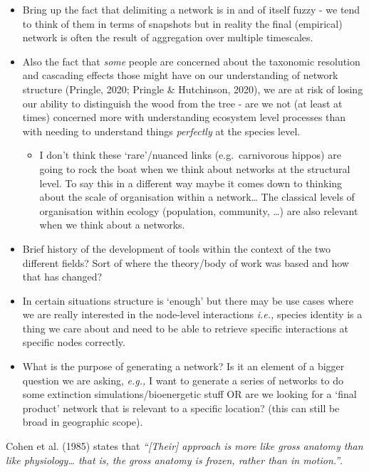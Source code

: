 \documentclass[
]{article}
\providecommand{\tightlist}{%
  \setlength{\itemsep}{0pt}\setlength{\parskip}{0pt}}\usepackage{longtable,booktabs,array}
\begin{document}
\begin{itemize}
\item
  Bring up the fact that delimiting a network is in and of itself fuzzy
  - we tend to think of them in terms of snapshots but in reality the
  final (empirical) network is often the result of aggregation over
  multiple timescales.
\item
  Also the fact that \emph{some} people are concerned about the
  taxonomic resolution and cascading effects those might have on our
  understanding of network structure (Pringle, 2020; Pringle \&
  Hutchinson, 2020), we are at risk of losing our ability to distinguish
  the wood from the tree - are we not (at least at times) concerned more
  with understanding ecosystem level processes than with needing to
  understand things \emph{perfectly} at the species level.

  \begin{itemize}
  \tightlist
  \item
    I don't think these `rare'/nuanced links (e.g.~carnivorous hippos)
    are going to rock the boat when we think about networks at the
    structural level. To say this in a different way maybe it comes down
    to thinking about the scale of organisation within a network\ldots{}
    The classical levels of organisation within ecology (population,
    community, \ldots) are also relevant when we think about a networks.
  \end{itemize}
\item
  Brief history of the development of tools within the context of the
  two different fields? Sort of where the theory/body of work was based
  and how that has changed?
\item
  In certain situations structure is `enough' but there may be use cases
  where we are really interested in the node-level interactions
  \emph{i.e.,} species identity is a thing we care about and need to be
  able to retrieve specific interactions at specific nodes correctly.
\item
  What is the purpose of generating a network? Is it an element of a
  bigger question we are asking, \emph{e.g.,} I want to generate a
  series of networks to do some extinction simulations/bioenergetic
  stuff OR are we looking for a `final product' network that is relevant
  to a specific location? (this can still be broad in geographic scope).
\end{itemize}

Cohen et al. (1985) states that \emph{``{[}Their{]} approach is more
like gross anatomy than like physiology\ldots{} that is, the gross
anatomy is frozen, rather than in motion.''}.
\end{document}
